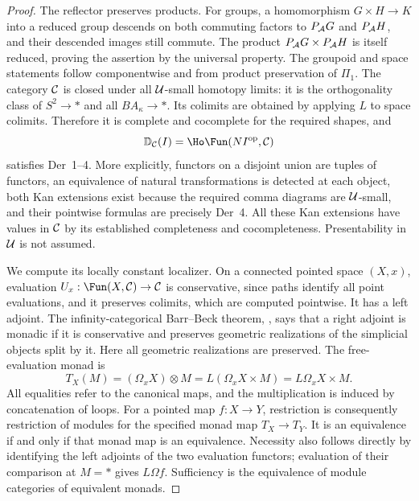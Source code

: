\begin{proof}
The reflector preserves products. For groups, a homomorphism $G\times H\to K$ into a reduced group descends on both commuting factors to $P_{\mathcal A} G$ and $P_{\mathcal A} H$, and their descended images still commute. The product $P_{\mathcal A} G\times P_{\mathcal A} H$ is itself reduced, proving the assertion by the universal property. The groupoid and space statements follow componentwise and from product preservation of $\Pi_1$. The category $\mathcal C$ is closed under all $\mathcal U$-small homotopy limits: it is the orthogonality class of $S^2\to*$ and all $BA_\kappa\to*$. Its colimits are obtained by applying $L$ to space colimits. Therefore it is complete and cocomplete for the required shapes, and
\[
 \D_{\cC}(I)=\Ho\Fun(NI^{\mathrm{op}},\cC)
\]
satisfies Der~1--4. More explicitly, functors on a disjoint union are tuples of functors, an equivalence of natural transformations is detected at each object, both Kan extensions exist because the required comma diagrams are $\mathcal U$-small, and their pointwise formulas are precisely Der~4. All these Kan extensions have values in $\mathcal C$ by its established completeness and cocompleteness. Presentability in $\mathcal U$ is not assumed.

We compute its locally constant localizer. On a connected pointed space $(X,x)$, evaluation $U_x:\Fun(X,\cC)\to\cC$ is conservative, since paths identify all point evaluations, and it preserves colimits, which are computed pointwise. It has a left adjoint. The infinity-categorical Barr--Beck theorem, \cite[Theorem 4.7.3.5]{FGHLurieHA}, says that a right adjoint is monadic if it is conservative and preserves geometric realizations of the simplicial objects split by it. Here all geometric realizations are preserved. The free-evaluation monad is
\[
 T_X(M)=(\Omega_xX)\otimes M
        =L(\Omega_xX\times M)
        =L\Omega_xX\times M.
\]
All equalities refer to the canonical maps, and the multiplication is induced by concatenation of loops. For a pointed map $f:X\to Y$, restriction is consequently restriction of modules for the specified monad map $T_X\to T_Y$. It is an equivalence if and only if that monad map is an equivalence. Necessity also follows directly by identifying the left adjoints of the two evaluation functors; evaluation of their comparison at $M=*$ gives $L\Omega f$. Sufficiency is the equivalence of module categories of equivalent monads.


\end{proof}
